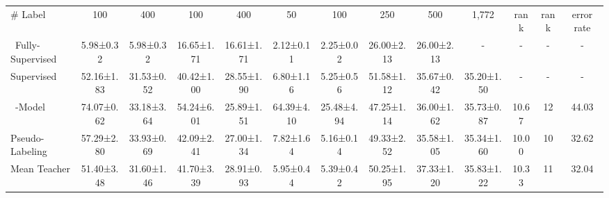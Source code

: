 \documentclass{article}
\begin{document}
\begin{table}[t!]
{\begin{tabular}{l|cc|cc|cc|cc|c|c|c|c}
\# Label & \multicolumn{1}{c}{100} & \multicolumn{1}{c|}{400} & \multicolumn{1}{c}{100}  & \multicolumn{1}{c|}{400}   & \multicolumn{1}{c}{50}  & \multicolumn{1}{c|}{100}   &  \multicolumn{1}{c}{250}  & \multicolumn{1}{c|}{500} &  \multicolumn{1}{c|}{1,772} & \multicolumn{1}{c|}{rank}   & \multicolumn{1}{c|}{rank} &  \multicolumn{1}{c}{error rate}
 \\ \cmidrule(r){1-1}\cmidrule(lr){2-3}\cmidrule(lr){4-5}\cmidrule(lr){6-7}\cmidrule(lr){8-9}\cmidrule(lr){10-10}\cmidrule(l){11-11}\cmidrule(l){12-12}\cmidrule(l){13-13}\,
Fully-Supervised & 5.98\tiny{±0.32}           & 5.98\tiny{±0.32}           & 16.65\tiny{±1.71}          & 16.61\tiny{±1.71}          & 2.12\tiny{±0.11}          & 2.25\tiny{±0.02}          & 26.00\tiny{±2.13}          & 26.00\tiny{±2.13}          & -         & -                                 & -                              & -                                   \\
Supervised       & 52.16\tiny{±1.83}          & 31.53\tiny{±0.52}          & 40.42\tiny{±1.00}          & 28.55\tiny{±1.90}          & 6.80\tiny{±1.16}          & 5.25\tiny{±0.56}          & 51.58\tiny{±1.12}          & 35.67\tiny{±0.42}          & 35.20\tiny{±1.50}          & -                                 & -                              & -                                   \\
\cmidrule(r){1-1}\cmidrule(lr){2-3}\cmidrule(lr){4-5}\cmidrule(lr){6-7}\cmidrule(lr){8-9}\cmidrule(lr){10-10}\cmidrule(l){11-11}\cmidrule(l){12-12}\cmidrule(l){13-13}\,
-Model         & 74.07\tiny{±0.62}          & 33.18\tiny{±3.64}          & 54.24\tiny{±6.01}          & 25.89\tiny{±1.51}          & 64.39\tiny{±4.10}         & 25.48\tiny{±4.94}         & 47.25\tiny{±1.14}          & 36.00\tiny{±1.62}          & 35.73\tiny{±0.87}          & 10.67                             & 12                             & 44.03                               \\
Pseudo-Labeling  & 57.29\tiny{±2.80}          & 33.93\tiny{±0.69}          & 42.09\tiny{±2.41}          & 27.00\tiny{±1.34}          & 7.82\tiny{±1.64}          & 5.16\tiny{±0.14}          & 49.33\tiny{±2.52}          & 35.58\tiny{±1.05}          & 35.34\tiny{±1.60}          & 10.00                             & 10                             & 32.62                               \\
Mean Teacher     & 51.40\tiny{±3.48}          & 31.60\tiny{±1.46}          & 41.70\tiny{±3.39}          & 28.91\tiny{±0.93}          & 5.95\tiny{±0.44}          & 5.39\tiny{±0.42}          & 50.25\tiny{±1.95}          & 37.33\tiny{±1.20}          & 35.83\tiny{±1.22}          & 10.33                             & 11                             & 32.04                               \\

\end{tabular}}
\end{table}
\end{document}
